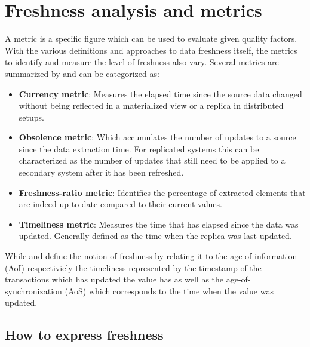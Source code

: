 
\section{Freshness analysis and metrics}
\label{r:freshness_metrics}
A metric is a specific figure which can be used to evaluate given quality factors.
With the various definitions and approaches to data freshness itself, the metrics to identify and measure the level of freshness also vary.
Several metrics are summarized by \cite{cho:2000}\cite{pacitti:2000}\cite{peralta:2006} and can be categorized as:
\begin{itemize}
    \item \textbf{Currency metric}: Measures the elapsed time since the source data changed without being reflected in a materialized view or a replica in distributed setups.
    \item \textbf{Obsolence metric}: Which accumulates the number of updates to a source since the data extraction time. For replicated systems this can be characterized as the 
    number of updates that still need to be applied to a secondary system after it has been refreshed.
    \item \textbf{Freshness-ratio metric}: Identifies the percentage of extracted elements that are indeed up-to-date compared to their current values.
    \item \textbf{Timeliness metric}: Measures the time that has elapsed since the data was updated. Generally defined as the time when the replica was last updated.
\end{itemize}



While \cite{bedewy:2016} and \cite{zhong:2018} define the notion of freshness by relating it to the age-of-information (AoI) respectiviely the timeliness represented by 
the timestamp of the transactions which has updated the value has as well as the age-of-synchronization (AoS) which corresponds to the time when the value was updated.




\subsection{How to express freshness}
\label{r:express_freshness}

